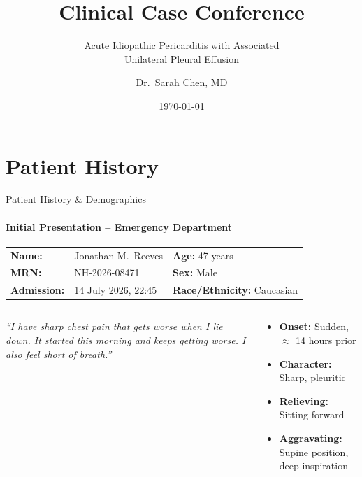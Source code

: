 \documentclass[10pt,aspectratio=169]{beamer}
\title{Clinical Case Conference}
\subtitle{Acute Idiopathic Pericarditis with Associated\\Unilateral Pleural Effusion}
\author{Dr.\ Sarah Chen, MD}
\institute{Department of Internal Medicine\\Nimbus University Hospital}
\date{\today}
\begin{document}
{
\begin{frame}[plain]
  \titlepage
\end{frame}}

\section{Patient History}
\begin{frame}{Patient History \& Demographics}
  \framesubtitle{Initial Presentation -- Emergency Department}

  \begin{tcolorbox}[infobox,title={\faUser\hspace{4pt}Patient Demographics}]
    \small
    \begin{tabular}{@{}p{}p{}p{}@{}}
      \textbf{Name:} & Jonathan M.\ Reeves & \textbf{Age:} 47 years \\
      \textbf{MRN:} & NH-2026-08471 & \textbf{Sex:} Male \\
      \textbf{Admission:} & 14 July 2026, 22:45 & \textbf{Race/Ethnicity:} Caucasian \\
    \end{tabular}
  \end{tcolorbox}

  \vspace{0.3cm}

  \begin{columns}[T]
    \begin{tcolorbox}[infobox,title={\faClipboard\hspace{4pt}Chief Complaint}]
      \small\textit{``I have sharp chest pain that gets worse when I lie down. It started this morning and keeps getting worse. I also feel short of breath.''}
    \end{tcolorbox}

    \begin{tcolorbox}[alertbox,title={\faExclamationTriangle\hspace{4pt}Key History}]
      \small
      \begin{itemize}
        \item \textbf{Onset:} Sudden, $\approx$ 14 hours prior
        \item \textbf{Character:} Sharp, pleuritic
        \item \textbf{Relieving:} Sitting forward
        \item \textbf{Aggravating:} Supine position, deep inspiration
      \end{itemize}
    \end{tcolorbox}
  \end{columns}


\end{frame}
\end{document}
